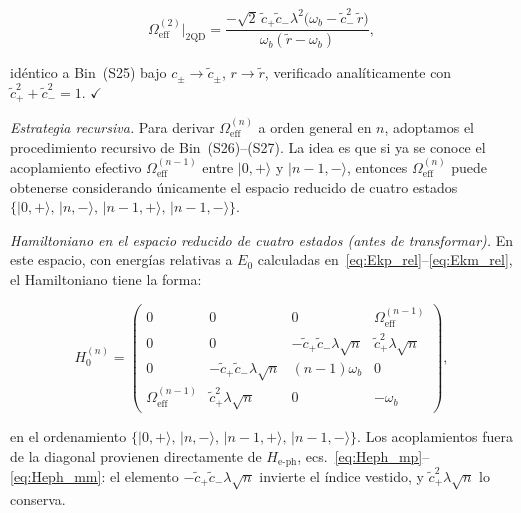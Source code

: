 \documentclass[12pt]{article}
\begin{document}
\begin{equation}
	\Omega_\mathrm{eff}^{(2)}\big|_{2\mathrm{QD}}
	= \frac{-\sqrt{2}\,\tilde{c}_+\tilde{c}_-\lambda^2
		\bigl(\omega_b - \tilde{c}_-^2\,\tilde{r}\bigr)}
	{\omega_b(\tilde{r}-\omega_b)},
	\label{eq:Oeff2_III}
\end{equation}

\noindent
idéntico a Bin~(S25) bajo $c_\pm \to \tilde{c}_\pm$, $r \to \tilde{r}$,
verificado analíticamente con $\tilde{c}_+^2+\tilde{c}_-^2 = 1$. $\checkmark$


\textit{Estrategia recursiva.}
Para derivar $\Omega_\mathrm{eff}^{(n)}$ a orden general en $n$,
adoptamos el procedimiento recursivo de Bin~(S26)--(S27). La idea
es que si ya se conoce el acoplamiento efectivo
$\Omega_\mathrm{eff}^{(n-1)}$ entre $|0,{+}\rangle$ y
$|n-1,{-}\rangle$, entonces $\Omega_\mathrm{eff}^{(n)}$ puede
obtenerse considerando únicamente el espacio reducido de cuatro
estados
$\{|0,{+}\rangle,\,|n,{-}\rangle,\,|n-1,{+}\rangle,\,|n-1,{-}\rangle\}$.

\medskip
\noindent
\textit{Hamiltoniano en el espacio reducido de cuatro estados (antes de transformar).}
En este espacio, con energías relativas a $E_0$ calculadas
en~\eqref{eq:Ekp_rel}--\eqref{eq:Ekm_rel}, el Hamiltoniano
tiene la forma:

\begin{equation}
	H^{(n)}_0 = \begin{pmatrix}
		0 & 0 & 0 & \Omega_\mathrm{eff}^{(n-1)} \\[4pt]
		0 & 0 & -\tilde{c}_+\tilde{c}_-\lambda\sqrt{n} &
		\tilde{c}_+^2\lambda\sqrt{n} \\[4pt]
		0 & -\tilde{c}_+\tilde{c}_-\lambda\sqrt{n} & (n-1)\omega_b & 0 \\[4pt]
		\Omega_\mathrm{eff}^{(n-1)} & \tilde{c}_+^2\lambda\sqrt{n} & 0 & -\omega_b
	\end{pmatrix},
	\label{eq:Hn0_4estados}
\end{equation}

\noindent
en el ordenamiento
$\{|0,{+}\rangle,\,|n,{-}\rangle,\,|n-1,{+}\rangle,\,|n-1,{-}\rangle\}$.
Los acoplamientos fuera de la diagonal provienen directamente de
$H_\mathrm{e\text{-}ph}$, ecs.~\eqref{eq:Heph_mp}--\eqref{eq:Heph_mm}:
el elemento $-\tilde{c}_+\tilde{c}_-\lambda\sqrt{n}$ invierte
el índice vestido, y $\tilde{c}_+^2\lambda\sqrt{n}$ lo conserva.
\end{document}

